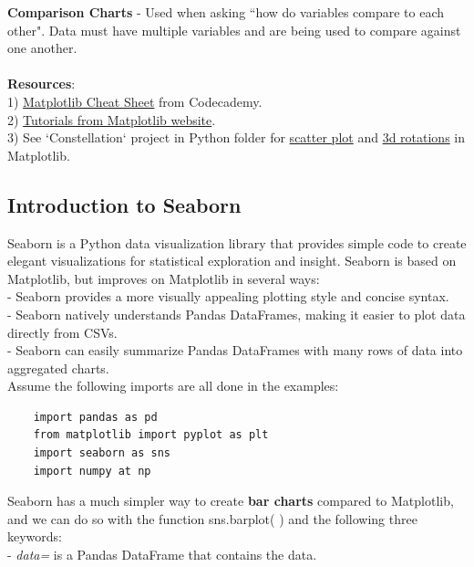 \documentclass[11pt, a4paper]{article}
\begin{document}
\begin{spacing}{1.1}
	\textbf{Comparison Charts} - Used when asking ``how do variables compare to each other". Data must have multiple variables and are being used to compare against one another. \\~\\
	\textbf{Resources}: \\
	1) \href{https://s3.amazonaws.com/codecademy-content/courses/matplotlib/data_vis_matplotlib_cheatsheet_v1_revisons.pdf}{Matplotlib Cheat Sheet} from Codecademy. \\
	2) \href{https://matplotlib.org/tutorials/index.html}{Tutorials from Matplotlib website}. \\
	3) See `Constellation` project in Python folder for \underline{scatter plot} and \underline{3d rotations} in Matplotlib. \newpage

	\subsection{Introduction to Seaborn}
	Seaborn is a Python data visualization library that provides simple code to create elegant visualizations for statistical exploration and insight. Seaborn is based on Matplotlib, but improves on Matplotlib in several ways: \\	
	\hspace*{3mm} - Seaborn provides a more visually appealing plotting style and concise syntax. \\
	\hspace*{3mm} - Seaborn natively understands Pandas DataFrames, making it easier to plot data directly from CSVs. \\
	\hspace*{3mm} - Seaborn can easily summarize Pandas DataFrames with many rows of data into aggregated charts. \vspace*{2mm}\\
	Assume the following imports are all done in the examples:
	\begin{lstlisting}
	import pandas as pd
	from matplotlib import pyplot as plt
	import seaborn as sns
	import numpy at np \end{lstlisting}\vspace*{1mm}
	Seaborn has a much simpler way to create \textbf{bar charts} compared to Matplotlib, and we can do so with the function sns.barplot( ) and the following three keywords: \\
	\hspace*{3mm} - \textit{data=} is a Pandas DataFrame that contains the data. \\

\end{spacing}
\end{document}
